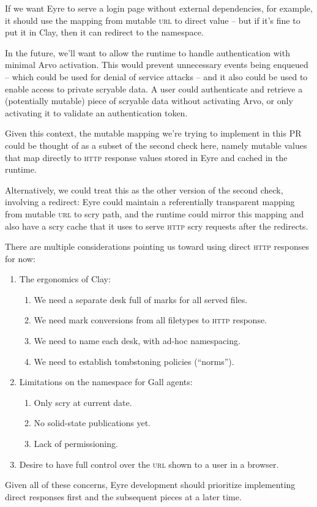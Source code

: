 \documentclass[twoside]{article}
\begin{document}
If we want Eyre to serve a login page without external dependencies, for example, it should use the mapping from mutable \textsc{url} to direct value – but if it's fine to put it in Clay, then it can redirect to the namespace.

In the future, we'll want to allow the runtime to handle authentication with minimal Arvo activation.  This would prevent unnecessary events being enqueued – which could be used for denial of service attacks – and it also could be used to enable access to private scryable data.  A user could authenticate and retrieve a (potentially mutable) piece of scryable data without activating Arvo, or only activating it to validate an authentication token.

Given this context, the mutable mapping we're trying to implement in this PR could be thought of as a subset of the second check here, namely mutable values that map directly to \textsc{http} response values stored in Eyre and cached in the runtime.

Alternatively, we could treat this as the other version of the second check, involving a redirect: Eyre could maintain a referentially transparent mapping from mutable \textsc{url} to scry path, and the runtime could mirror this mapping and also have a scry cache that it uses to serve \textsc{http} scry requests after the redirects.

There are multiple considerations pointing us toward using direct \textsc{http} responses for now:

\begin{enumerate}
  \item  The ergonomics of Clay:
  \begin{enumerate}
    \item  We need a separate desk full of marks for all served files.
    \item  We need mark conversions from all filetypes to \textsc{http} response.
    \item  We need to name each desk, with ad-hoc namespacing.
    \item  We need to establish tombstoning policies (``norms'').
  \end{enumerate}
  \item  Limitations on the namespace for Gall agents:
  \begin{enumerate}
    \item  Only scry at current date.
    \item  No solid-state publications yet.
    \item  Lack of permissioning.
  \end{enumerate}
  \item  Desire to have full control over the \textsc{url} shown to a user in a browser.
\end{enumerate}

Given all of these concerns, Eyre development should prioritize implementing direct responses first and the subsequent pieces at a later time.\tombstone{}

\printbibliography
\end{document}
